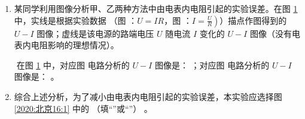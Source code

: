 \begin{enumerate}
\begin{enumerate}
\item 
某同学利用图像分析甲、乙两种方法中由电表内电阻引起的实验误差。在图 \ref{2020:北京16:3} 中，实线是根据实验数据
（图  ：$ U=IR $，图  ：$\left.I=\frac{U}{R}\right)$）描点作图得到的 $ U-I $ 图像；虚线是该电源的路端电压 $ U $ 随电流 $ I $ 变化的
$ U-I $ 图像（没有电表内电阻影响的理想情况）。
\begin{figure}[h!]
\centering

\caption{}\label{2020:北京16:3}
\end{figure}




在图 \ref{2020:北京16:3} 中，对应图  电路分析的 $ U-I $ 图像是： \underlinegap ；对应图  电路分析的 $ U-I $ 图像是： \underlinegap 。
\item 
综合上述分析，为了减小由电表内电阻引起的实验误差，本实验应选择图 \ref{2020:北京16:1} 中的 \underlinegap （填“”或“”）
。

\end{enumerate}




\gaokaojs


\end{enumerate}

